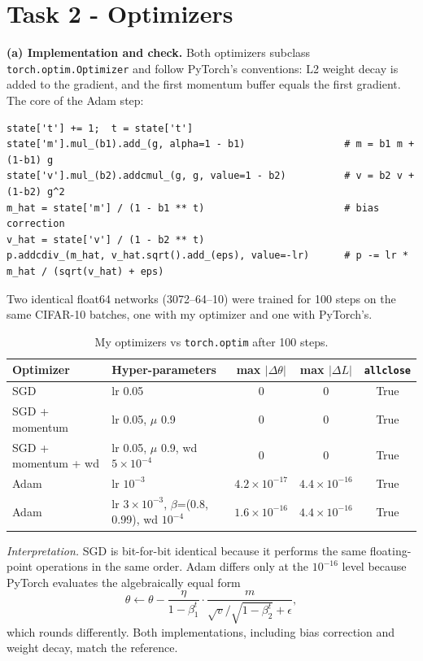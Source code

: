 \documentclass[10pt,a4paper]{article}
\begin{document}
\section{Task 2 - Optimizers}
\textbf{(a) Implementation and check.} Both optimizers subclass \texttt{torch.optim.Optimizer} and follow PyTorch's conventions:
L2 weight decay is added to the gradient, and the first momentum buffer equals the first gradient. The core of the Adam step:
\begin{lstlisting}
state['t'] += 1;  t = state['t']
state['m'].mul_(b1).add_(g, alpha=1 - b1)                 # m = b1 m + (1-b1) g
state['v'].mul_(b2).addcmul_(g, g, value=1 - b2)          # v = b2 v + (1-b2) g^2
m_hat = state['m'] / (1 - b1 ** t)                        # bias correction
v_hat = state['v'] / (1 - b2 ** t)
p.addcdiv_(m_hat, v_hat.sqrt().add_(eps), value=-lr)      # p -= lr * m_hat / (sqrt(v_hat) + eps)
\end{lstlisting}
Two identical float64 networks (3072--64--10) were trained for 100 steps on the same CIFAR-10 batches, one with my optimizer and one
with PyTorch's.
\begin{table}[H]\centering\small
\caption{My optimizers vs \texttt{torch.optim} after 100 steps.}
\begin{tabular}{llccc}
\toprule
Optimizer & Hyper-parameters & max $|\Delta\theta|$ & max $|\Delta L|$ & \texttt{allclose}\\
\midrule
SGD & lr 0.05 & 0 & 0 & True\\
SGD + momentum & lr 0.05, $\mu$ 0.9 & 0 & 0 & True\\
SGD + momentum + wd & lr 0.05, $\mu$ 0.9, wd $5\!\times\!10^{-4}$ & 0 & 0 & True\\
Adam & lr $10^{-3}$ & $4.2\times10^{-17}$ & $4.4\times10^{-16}$ & True\\
Adam & lr $3\!\times\!10^{-3}$, $\beta$=(0.8, 0.99), wd $10^{-4}$ & $1.6\times10^{-16}$ & $4.4\times10^{-16}$ & True\\
\bottomrule
\end{tabular}
\end{table}
\textit{Interpretation.} SGD is bit-for-bit identical because it performs the same floating-point operations in the same order. Adam
differs only at the $10^{-16}$ level because PyTorch evaluates the algebraically equal form
\[
\theta \leftarrow \theta - \frac{\eta}{1-\beta_1^t}\cdot\frac{m}{\sqrt{v}/\sqrt{1-\beta_2^t}+\epsilon},
\]
which rounds differently. Both implementations, including bias correction and weight decay, match the reference.
\end{document}
